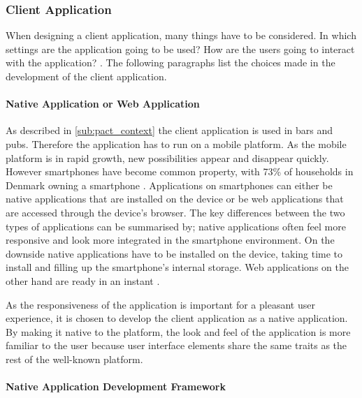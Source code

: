 \subsubsection{Client Application}
\label{ssub:client_application}

When designing a client application, many things have to be considered.  In which settings are the application going to be used? How are the users going to interact with the application? . The following paragraphs list the choices made in the development of the client application.

\paragraph{Native Application or Web Application}
\label{par:native_application_or_web_application}

As described in \cref{sub:pact_context} the client application is used in bars and pubs. Therefore the application has to run on a mobile platform. As the mobile platform is in rapid growth, new possibilities appear and disappear quickly. However smartphones have become common property, with 73\% of households in Denmark owning a smartphone \cite{smartphone2014}. Applications on smartphones can either be native applications that are installed on the device or be web applications that are accessed through the device's browser. The key differences between the two types of applications can be summarised by; native applications often feel more responsive and look more integrated in the smartphone environment. On the downside native applications have to be installed on the device, taking time to install and filling up the smartphone's internal storage. Web applications on the other hand are ready in an instant \cite{charland2011mobile}.

As the responsiveness of the application is important for a pleasant user experience, it is chosen to develop the client application as a native application. By making it native to the platform, the look and feel of the application is more familiar to the user because user interface elements share the same traits as the rest of the well-known platform.

\paragraph{Native Application Development Framework}
\label{par:native_application_development_framework}

